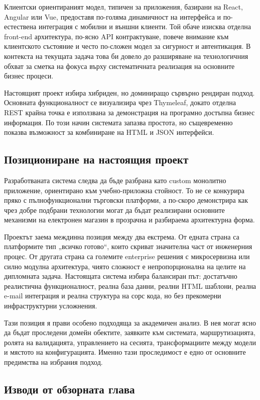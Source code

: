 Клиентски ориентираният модел, типичен за приложения, базирани на React, Angular или Vue, предоставя по-голяма динамичност на интерфейса и по-естествена интеграция с мобилни и външни клиенти. Той обаче изисква отделна front-end архитектура, по-ясно API контрактуване, повече внимание към клиентското състояние и често по-сложен модел за сигурност и автентикация. В контекста на текущата задача това би довело до разширяване на технологичния обхват за сметка на фокуса върху систематичната реализация на основните бизнес процеси.

Настоящият проект избира хибриден, но доминиращо сървърно рендиран подход. Основната функционалност се визуализира чрез Thymeleaf, докато отделна REST крайна точка е използвана за демонстрация на програмно достъпна бизнес информация. По този начин системата запазва простота, но същевременно показва възможност за комбиниране на HTML и JSON интерфейси.

\subsection{Позициониране на настоящия проект}

Разработваната система следва да бъде разбрана като custom монолитно приложение, ориентирано към учебно-приложна стойност. То не се конкурира пряко с пълнофункционални търговски платформи, а по-скоро демонстрира как чрез добре подбрани технологии могат да бъдат реализирани основните механизми на електронен магазин в прозрачна и разбираема архитектурна форма.

Проектът заема междинна позиция между два екстрема. От едната страна са платформите тип „всичко готово“, които скриват значителна част от инженерния процес. От другата страна са големите enterprise решения с микросервизна или силно модулна архитектура, чиято сложност е непропорционална на целите на дипломната задача. Настоящата система избира балансиран път: достатъчно реалистична функционалност, реална база данни, реални HTML шаблони, реална e-mail интеграция и реална структура на сорс кода, но без прекомерни инфраструктурни усложнения.

Тази позиция я прави особено подходяща за академичен анализ. В нея могат ясно да бъдат проследени домейн обектите, заявките към системата, маршрутизацията, ролята на валидацията, управлението на сесията, трансформациите между модели и мястото на конфигурацията. Именно тази проследимост е едно от основните предимства на избрания подход.

\subsection{Изводи от обзорната глава}

